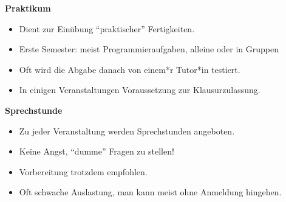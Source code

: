 \newpage

\noindent\textbf{Praktikum}
\begin{multicols}{2}
    \begin{itemize}
        \item Dient zur Einübung "`praktischer"' Fertigkeiten.
        \item Erste Semester: meist Programmieraufgaben, alleine oder in Gruppen
        \item Oft wird die Abgabe danach von einem*r Tutor*in testiert.
        \item In einigen Veranstaltungen Voraussetzung zur Klausurzulassung.
    \end{itemize}
\end{multicols}


\noindent\textbf{Sprechstunde}
\begin{multicols}{2}
    \begin{itemize}
        \item Zu jeder Veranstaltung werden Sprechstunden angeboten.
        \item Keine Angst, "`dumme"' Fragen zu stellen!
        \item Vorbereitung trotzdem empfohlen.
        \item Oft schwache Auslastung, man kann meist ohne Anmeldung hingehen.
    \end{itemize}

\end{multicols}
